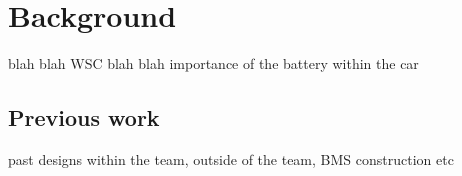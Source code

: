 \chapter{Background}\label{ch:background}

blah blah WSC
blah blah importance of the battery within the car

\section{Previous work}

past designs within the team, outside of the team, BMS construction etc
